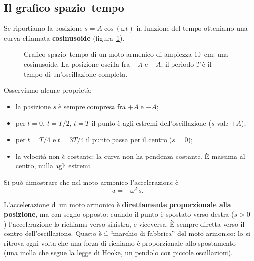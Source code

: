\subsection{Il grafico spazio--tempo}
Se riportiamo la posizione $s = A\cos(\omega t)$ in funzione del tempo otteniamo una curva chiamata \textbf{cosinusoide} (figura~\ref{fig:cosinusoide}).

\begin{figure}[!htbp]
    \centering
    \caption{Grafico spazio--tempo di un moto armonico di ampiezza \SI{10}{\centi\metre}: una cosinusoide. La posizione oscilla fra $+A$ e $-A$; il periodo $T$ è il tempo di un'oscillazione completa.}
    \label{fig:cosinusoide}
\end{figure}

Osserviamo alcune proprietà:
\begin{itemize}
    \item la posizione $s$ è sempre compresa fra $+A$ e $-A$;
    \item per $t = 0$, $t = T/2$, $t = T$ il punto è agli estremi dell'oscillazione ($s$ vale $\pm A$);
    \item per $t = T/4$ e $t = 3T/4$ il punto passa per il centro ($s = 0$);
    \item la velocità non è costante: la curva non ha pendenza costante. È massima al centro, nulla agli estremi.
\end{itemize}

Si può dimostrare che nel moto armonico l'accelerazione è
\[ a = -\omega^2\,s. \]

\begin{remark}
L'accelerazione di un moto armonico è \textbf{direttamente proporzionale alla posizione}, ma con segno opposto: quando il punto è spostato verso destra ($s > 0$) l'accelerazione lo richiama verso sinistra, e viceversa. È sempre diretta verso il centro dell'oscillazione. Questo è il ``marchio di fabbrica'' del moto armonico: lo si ritrova ogni volta che una forza di richiamo è proporzionale allo spostamento (una molla che segue la legge di Hooke, un pendolo con piccole oscillazioni).
\end{remark}

